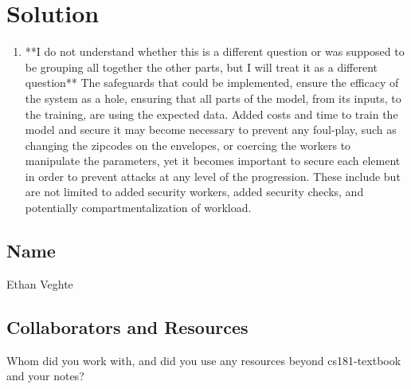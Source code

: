 \documentclass[submit]{harvardml}
\newenvironment{answer}
  {\section*{Solution}}
{}
\begin{document}
\begin{answer}
\begin{enumerate}
\begin{enumerate}
        \item **I do not understand whether this is a different question or was supposed to be grouping all together the other parts, but I will treat it as a different question** The safeguards that could be implemented, ensure the efficacy of the system as a hole, ensuring that all parts of the model, from its inputs, to the training, are using the expected data. Added costs and time to train the model and secure it may become necessary to prevent any foul-play, such as changing the zipcodes on the envelopes, or coercing the workers to manipulate the parameters, yet it becomes important to secure each element in order to prevent attacks at any level of the progression. These include but are not limited to added security workers, added security checks, and potentially compartmentalization of workload. 
      \end{enumerate}


  \end{enumerate}

\end{answer}


\newpage
\subsection*{Name} Ethan Veghte

\subsection*{Collaborators and Resources}
Whom did you work with, and did you use any resources beyond cs181-textbook and your notes?
\end{document}
